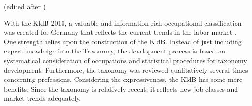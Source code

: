 \documentclass[12pt, a4paper, titlepage]{article}
\begin{document}
\begin{table}[hb!]
  \center
  \caption{\label{tab: T2} Overview of \ac{KldB} (edited after \citep{Bundesagentur2011b})}
  \end{table}


\begin{table}[]
  \caption{\label{tab: T4} Overview of Level of requirements on Level 5} (edited after \citep{Bundesagentur2011b})
  \end{table}

With the \ac{KldB} 2010, a valuable and information-rich occupational classification was created for Germany that reflects the current trends in the labor market \citep{Paulus2013}. One strength relies upon the construction of the \ac{KldB}. Instead of just including expert knowledge into the Taxonomy, the development process is based on systematical consideration of occupations and statistical procedures for taxonomy development. Furthermore, the taxonomy was reviewed qualitatively several times concerning professions. Considering the expressiveness, the \ac{KldB} has some more benefits. Since the taxonomy is relatively recent, it reflects new job classes and market trends adequately.
\end{document}
